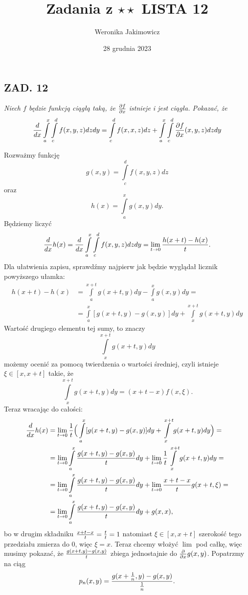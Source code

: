 \documentclass{article}[13pt]
\author{Weronika Jakimowicz}
\title{Zadania z $\star\star$ LISTA 12}
\date{28 grudnia 2023}
\begin{document}
    \maketitle

\subsection*{ZAD. 12}
\emph{
    Niech $f$ będzie funkcją ciągłą taką, że ${\partial f\over\partial x}$ istnieje i jest ciągła. Pokazać, że
}
$${d\over dx}\int\limits_a^x\int\limits_c^df(x,y,z)dzdy=\int\limits_c^df(x,x,z)dz+\int\limits_a^x\int\limits_c^d{\partial f\over\partial x}(x,y,z)dzdy$$

Rozważmy funkcję
$$g(x,y)=\int\limits_c^df(x,y,z)dz$$
oraz
$$h(x)=\int\limits_a^xg(x,y)dy.$$
Będziemy liczyć
$${d\over dx}h(x)={d\over dx}\int\limits_a^x\int\limits_c^df(x,y,z)dzdy=\lim\limits_{t\to0}{h(x+t)-h(x)\over t}.$$
Dla ułatwienia zapisu, sprawdźmy najpierw jak będzie wyglądał licznik powyższego ułamka:
\begin{align*}
    h(x+t)-h(x)&=\int\limits_a^{x+t}g(x+t,y)dy-\int\limits_a^xg(x,y)dy=\\
    &=\int\limits_a^x[g(x+t, y)-g(x, y)]dy+\int\limits_x^{x+t}g(x+t, y)dy
\end{align*}
Wartość drugiego elementu tej sumy, to znaczy
$$\int\limits_x^{x+t}g(x+t, y)dy$$
możemy ocenić za pomocą twierdzenia o wartości średniej, czyli istnieje $\xi\in[x, x+t]$ takie, że
$$\int\limits_x^{x+t}g(x+t, y)dy=(x+t-x)f(x, \xi).$$
Teraz wracając do całości:
\begin{align*}
    {d\over dx}h(x)&=\lim\limits_{t\to0}\frac1t\Big(\int\limits_a^{x}[g(x+t, y)-g(x,y)]dy+\int\limits_x^{x+t}g(x+t, y)dy\Big)=\\
    &=\lim\limits_{t\to0}\int\limits_a^x{g(x+t, y)-g(x,y)\over t}dy+\lim\limits_{t\to0}\frac1t\int\limits_x^{x+t}g(x+t, y)dy=\\
    &=\lim\limits_{t\to0}\int\limits_a^x{g(x+t, y)-g(x,y)\over t}dy+\lim\limits_{t\to0}{x+t-x\over t}g(x+t, \xi)=\\
    &=\lim\limits_{t\to0}\int\limits_a^x{g(x+t, y)-g(x,y)\over t}dy+g(x, x),
\end{align*}
bo w drugim składniku ${x+t-x\over t}={t\over t}=1$ natomiast $\xi\in[x, x+t]$ szerokość tego przedziału zmierza do $0$, więc $\xi=x$. Teraz chcemy włożyć $\lim$ pod całkę, więc musimy pokazać, że ${g(x+t, y)-g(x, y)\over t}$ zbiega jednostajnie do ${\partial\over\partial x}g(x, y)$. Popatrzmy na ciąg
$$p_n(x, y)={g(x+\frac 1n, y)-g(x, y)\over \frac1n}.$$
\end{document}
